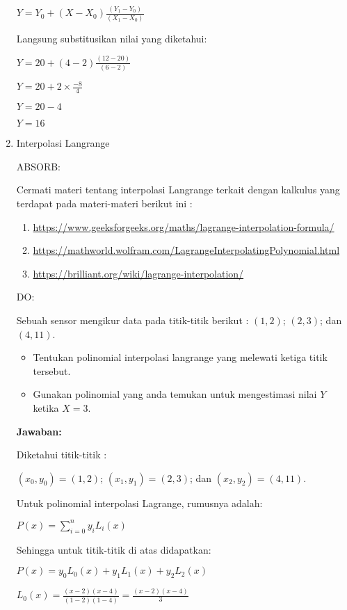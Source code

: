 \documentclass[a4paper]{article}
\begin{document}
\begin{enumerate}[itemsep=1em,leftmargin=*]
  \(Y = Y_0 + (X - X_0)\frac{(Y_1 - Y_0)}{(X_1 - X_0)}\)

  Langsung substitusikan nilai yang diketahui:

  \(Y = 20 + (4 - 2)\frac{(12 - 20)}{(6 - 2)}\)

  \(Y = 20 + 2 \times \frac{-8}{4}\)

  \(Y = 20 - 4\)

  \(Y = 16\)

  \item Interpolasi Langrange
  
  ABSORB:

  Cermati materi tentang interpolasi Langrange terkait dengan kalkulus yang terdapat pada materi-materi berikut ini :

  \begin{enumerate}
    \item \url{https://www.geeksforgeeks.org/maths/lagrange-interpolation-formula/}
    \item \url{https://mathworld.wolfram.com/LagrangeInterpolatingPolynomial.html}
    \item \url{https://brilliant.org/wiki/lagrange-interpolation/}
  \end{enumerate}

  DO:

  Sebuah sensor mengikur data pada titik-titik berikut : \((1, 2)\); \((2, 3)\); dan \((4, 11)\).

  \begin{itemize}
    \item Tentukan polinomial interpolasi langrange yang melewati ketiga titik tersebut.
    \item Gunakan polinomial yang anda temukan untuk mengestimasi nilai \(Y\) ketika \(X = 3\).
  \end{itemize}

  \textbf{Jawaban:}

  Diketahui titik-titik :
  
  \((x_0, y_0) = (1, 2)\); \((x_1, y_1) = (2, 3)\); dan \((x_2, y_2) = (4, 11)\).

  Untuk polinomial interpolasi Lagrange, rumusnya adalah:

  \(P(x) = \sum_{i=0}^{n} y_i L_i(x)\)

  Sehingga untuk titik-titik di atas didapatkan:

  \(P(x) = y_0 L_0(x) + y_1 L_1(x) + y_2 L_2(x)\)

  \(L_0(x) = \frac{(x - 2)(x - 4)}{(1 - 2)(1 - 4)} = \frac{(x - 2)(x - 4)}{3}\)


\end{enumerate}
\end{document}
